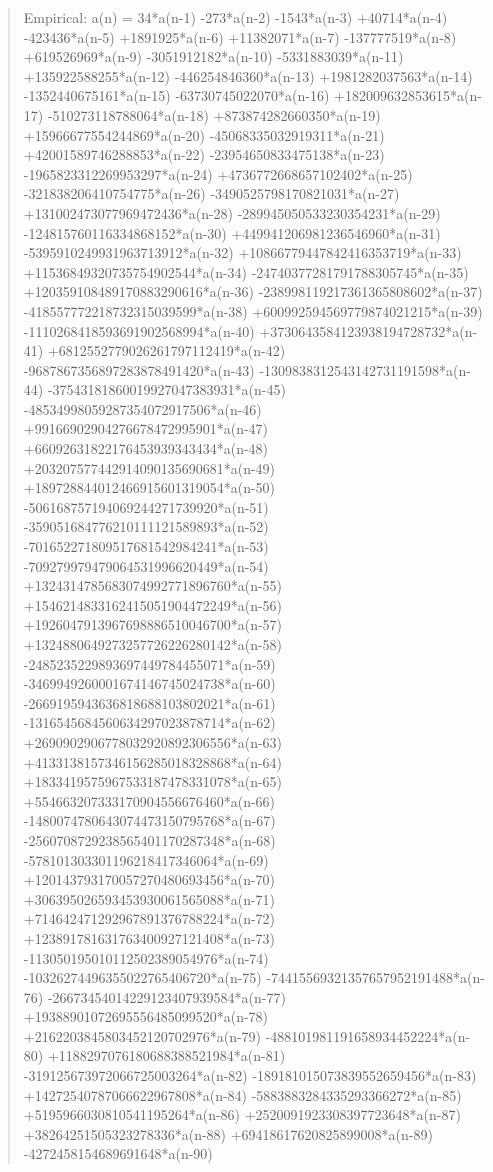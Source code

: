 \documentclass[11pt]{article}
\theoremstyle{definition}
\begin{document}
\begin{quote}\ttfamily Empirical: a(n) = 34*a(n-1) -273*a(n-2) -1543*a(n-3) +40714*a(n-4) -423436*a(n-5) +1891925*a(n-6) +11382071*a(n-7) -137777519*a(n-8) +619526969*a(n-9) -3051912182*a(n-10) -5331883039*a(n-11) +135922588255*a(n-12) -446254846360*a(n-13) +1981282037563*a(n-14) -1352440675161*a(n-15) -63730745022070*a(n-16) +182009632853615*a(n-17) -510273118788064*a(n-18) +873874282660350*a(n-19) +15966677554244869*a(n-20) -45068335032919311*a(n-21) +42001589746288853*a(n-22) -23954650833475138*a(n-23) -1965823312269953297*a(n-24) +4736772668657102402*a(n-25) -321838206410754775*a(n-26) -3490525798170821031*a(n-27) +131002473077969472436*a(n-28) -289945050533230354231*a(n-29) -124815760116334868152*a(n-30) +449941206981236546960*a(n-31) -5395910249931963713912*a(n-32) +10866779447842416353719*a(n-33) +11536849320735754902544*a(n-34) -24740377281791788305745*a(n-35) +120359108489170883290616*a(n-36) -238998119217361365808602*a(n-37) -418557772218732315039599*a(n-38) +600992594569779874021215*a(n-39) -1110268418593691902568994*a(n-40) +3730643584123938194728732*a(n-41) +6812552779026261797112419*a(n-42) -9687867356897283878491420*a(n-43) -1309838312543142731191598*a(n-44) -37543181860019927047383931*a(n-45) -48534998059287354072917506*a(n-46) +99166902904276678472995901*a(n-47) +66092631822176453939343434*a(n-48) +203207577442914090135690681*a(n-49) +189728844012466915601319054*a(n-50) -506168757194069244271739920*a(n-51) -359051684776210111121589893*a(n-52) -701652271809517681542984241*a(n-53) -709279979479064531996620449*a(n-54) +1324314785683074992771896760*a(n-55) +1546214833162415051904472249*a(n-56) +1926047913967698886510046700*a(n-57) +1324880649273257726226280142*a(n-58) -2485235229893697449784455071*a(n-59) -3469949260001674146745024738*a(n-60) -2669195943636818688103802021*a(n-61) -1316545684560634297023878714*a(n-62) +2690902906778032920892306556*a(n-63) +4133138157346156285018328868*a(n-64) +1833419575967533187478331078*a(n-65) +554663207333170904556676460*a(n-66) -1480074780643074473150795768*a(n-67) -2560708729238565401170287348*a(n-68) -578101303301196218417346064*a(n-69) +120143793170057270480693456*a(n-70) +306395026593453930061565088*a(n-71) +714642471292967891376788224*a(n-72) +123891781631763400927121408*a(n-73) -113050195010112502389054976*a(n-74) -10326274496355022765406720*a(n-75) -74415569321357657952191488*a(n-76) -26673454014229123407939584*a(n-77) +19388901072695556485099520*a(n-78) +2162203845803452120702976*a(n-79) -488101981191658934452224*a(n-80) +1188297076180688388521984*a(n-81) -319125673972066725003264*a(n-82) -189181015073839552659456*a(n-83) +14272540787066622967808*a(n-84) -5883883284335293366272*a(n-85) +5195966030810541195264*a(n-86) +2520091923308397723648*a(n-87) +38264251505323278336*a(n-88) +69418617620825899008*a(n-89) -4272458154689691648*a(n-90)\end{quote}
\end{document}
